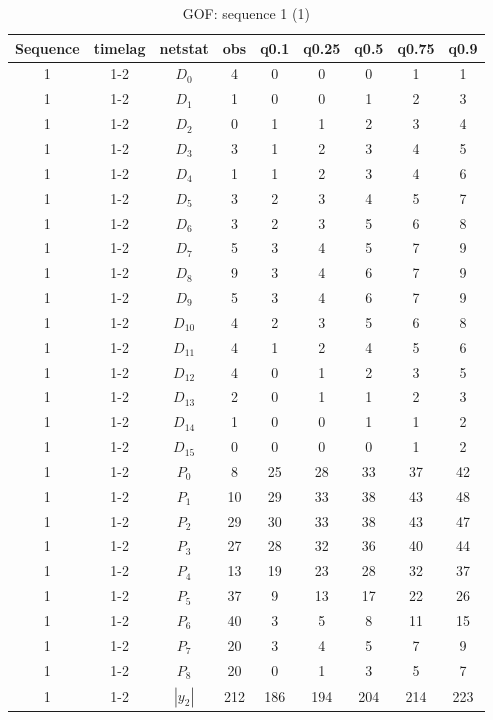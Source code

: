 \documentclass[a4paper, 11pt]{report}
\theoremstyle{definition}
\begin{document}
\begin{table}[h!]
    \centering
        \begin{tabular}{c| c | c | c | c |c |c |c |c }
            Sequence& timelag & netstat & obs & q0.1 & q0.25 & q0.5 & q0.75 & q0.9 \\
            \hline \hline
            1 & 1-2 & $D_0$ & 4 &  0& 0& 0& 1& 1 \\
            1 & 1-2 & $D_1$ & 1 &  0& 0& 1& 2& 3 \\
            1 & 1-2 & $D_2$ & 0 &  1& 1& 2& 3& 4 \\
            1 & 1-2 & $D_3$ & 3 &  1& 2& 3& 4& 5 \\
            1 & 1-2 & $D_4$ & 1 &  1& 2& 3& 4& 6 \\
            1 & 1-2 & $D_5$ & 3 &  2& 3& 4& 5& 7 \\
            1 & 1-2 & $D_6$ & 3 &  2& 3& 5& 6& 8 \\
            1 & 1-2 & $D_7$ & 5 &  3& 4& 5& 7& 9 \\
            1 & 1-2 & $D_8$ & 9 &  3& 4& 6& 7& 9 \\
            1 & 1-2 & $D_9$ & 5 &  3& 4& 6& 7& 9 \\
            1 & 1-2 & $D_{10}$ & 4 &  2& 3& 5& 6& 8 \\
            1 & 1-2 & $D_{11}$ & 4 &  1& 2& 4& 5& 6 \\
            1 & 1-2 & $D_{12}$ & 4 &  0& 1& 2& 3& 5 \\
            1 & 1-2 & $D_{13}$ & 2 &  0& 1& 1& 2& 3 \\
            1 & 1-2 & $D_{14}$ & 1 &  0& 0& 1& 1& 2 \\
            1 & 1-2 & $D_{15}$ & 0 &  0& 0& 0& 1& 2 \\
            1 & 1-2 & $P_0$ & 8 &  25& 28& 33& 37& 42 \\
            1 & 1-2 & $P_1$ & 10 & 29& 33& 38& 43& 48 \\
            1 & 1-2 & $P_2$ & 29 & 30& 33& 38& 43& 47 \\
            1 & 1-2 & $P_3$ & 27 & 28& 32& 36& 40& 44 \\
            1 & 1-2 & $P_4$ & 13 & 19& 23& 28& 32& 37 \\
            1 & 1-2 & $P_5$ & 37 &  9& 13& 17& 22& 26 \\
            1 & 1-2 & $P_6$ & 40 &  3& 5& 8& 11& 15 \\
            1 & 1-2 & $P_7$ & 20 &  3& 4& 5& 7& 9 \\
            1 & 1-2 & $P_8$ & 20 &  0& 1& 3& 5& 7 \\
            1 & 1-2 & $|y_2|$ & 212 &  186& 194& 204& 214& 223 \\
        \end{tabular}
        \caption{GOF: sequence 1 (1)}
    \end{table}
\end{document}
